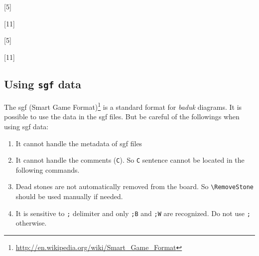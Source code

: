 \documentclass[a4paper]{oblivoir}
\begin{document}
\begin{boxedverbatim}
\begin{ksbadukpan}[badukpansize=6.5]
[5]
\end{ksbadukpan}

\begin{ksbadukpan}[badukpansize=6.5]
\KSBadukContinue
{}[11]
\end{ksbadukpan}

\begin{ksbadukpan}[badukpansize=6.5]
\end{ksbadukpan}
\end{boxedverbatim}

\bigskip

\ClearHistory

\noindent
\begin{ksbadukpan}[badukpansize=6.5]
[5]
\end{ksbadukpan}
\hfill
\begin{ksbadukpan}[badukpansize=6.5]
\KSBadukContinue
[11]
\end{ksbadukpan}

\noindent
\begin{ksbadukpan}[badukpansize=6.5]
\end{ksbadukpan}

\subsection{Using \texttt{sgf} data}

The sgf (Smart Game Format)\footnote{\url{http://en.wikipedia.org/wiki/Smart_Game_Format}} is a standard format for \textit{baduk} diagrams.
It is possible to use the data in the sgf files. But be careful of the followings when using sgf data:
\begin{enumerate} 
\item It cannot handle the metadata of sgf files
\item It cannot handle the comments (\texttt{C}). So \texttt{C} sentence cannot be located in the following commands.
\item Dead stones are not automatically removed from the board. So \verb+\RemoveStone+ should be used manually if needed.
\item It is sensitive to \verb|;| delimiter and only \texttt{;B} and \texttt{;W} are recognized. Do not use \verb|;| otherwise.
\end{enumerate}
\end{document}
